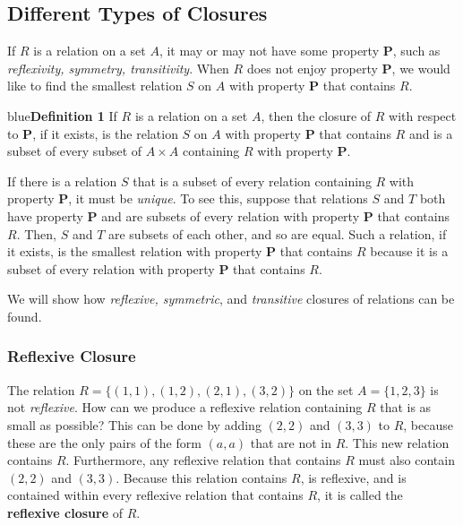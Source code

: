 \documentclass[11pt]{article}
\newenvironment{definition}[1]{\begin{mybox}{blue}{\textbf{Definition #1}}}{\end{mybox}}
\begin{document}
\subsection{Different Types of Closures}

If $R$ is a relation on a set $A$, it may or may not have some property \textbf{P}, such as \textit{reflexivity, symmetry,  transitivity}. When $R$ does not enjoy property \textbf{P}, we would like to find the smallest relation $S$ on $A$ with property \textbf{P} that contains $R$.

\begin{definition}{1}
If $R$ is a relation on a set $A$, then the closure of $R$ with respect to \textbf{P}, if it exists, is the relation $S$ on $A$ with property \textbf{P} that contains $R$ and is a subset of every subset of $A \times A$ containing $R$
with property \textbf{P}.
\end{definition}

If there is a relation $S$ that is a subset of every relation containing $R$ with property \textbf{P}, it must be \textit{unique}. To see this, suppose that relations $S$ and $T$ both have property \textbf{P} and are subsets of every relation with property \textbf{P} that contains $R$. Then, $S$ and $T$ are subsets of each other, and so are equal. Such a relation, if it exists, is the smallest relation with property \textbf{P} that contains $R$ because it is a subset of every relation with property \textbf{P} that contains $R$.

We will show how \textit{reflexive, symmetric}, and \textit{transitive} closures of relations can be found.

\subsubsection{Reflexive Closure}

The relation $R = \{(1, 1), (1, 2), (2, 1), (3, 2)\}$ on the set $A = \{1, 2, 3\}$ is not \textit{reflexive}. How can we produce a reflexive relation containing $R$ that is as small as possible? This can be done by adding $(2, 2)$ and $(3, 3)$ to $R$, because these are the only pairs of the form $(a, a)$ that are not in $R$. This new relation contains $R$. Furthermore, any reflexive relation that contains $R$ must also contain $(2, 2)$ and $(3, 3)$. Because this relation contains $R$, is reflexive, and is contained within every reflexive relation that contains $R$, it is called the \textbf{reflexive closure} of $R$.\\
\end{document}
